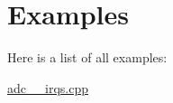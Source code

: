 \section{Examples}
Here is a list of all examples\+:\begin{DoxyCompactItemize}
\item 
\hyperlink{adc_2_irqs_8cpp-example}{adc\+\_\+\_\+irqs.\+cpp}
\end{DoxyCompactItemize}
